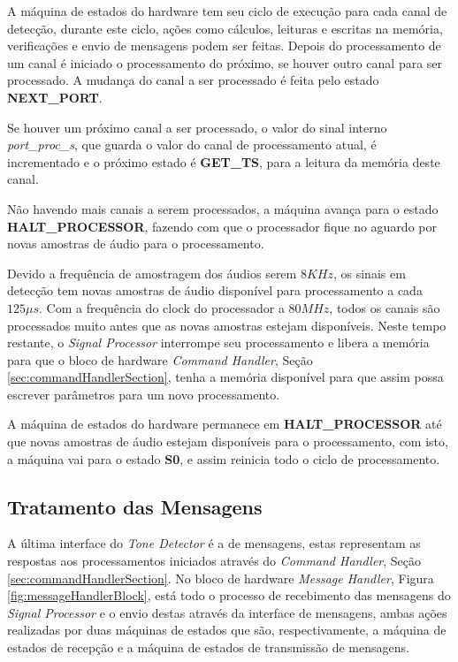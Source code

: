 \documentclass[monografia]{subfiles}
\begin{document}
			\label{sec:hardwareStateNEXTPORT}
				A máquina de estados do hardware tem seu ciclo de execução para cada canal de detecção, durante este ciclo, ações como cálculos, leituras e
				escritas na memória, verificações e envio de mensagens podem ser feitas. Depois do processamento de um canal é iniciado o processamento do 
				próximo, se houver outro canal para ser processado. A mudança do canal a ser processado é feita pelo estado \textbf{NEXT\_PORT}.

				Se houver um próximo canal a ser processado, o valor do sinal interno \textit{port\_proc\_s}, que guarda o valor do canal de processamento atual,
				é incrementado e o próximo estado é \textbf{GET\_TS}, para a leitura da memória deste canal.

				Não havendo mais canais a serem processados, a máquina avança para o estado \textbf{HALT\_PROCESSOR}, fazendo com que o processador fique no aguardo
				por novas amostras de áudio para o processamento.

				\newpage

			\label{sec:hardwareStateHALTPROCESSOR}
				Devido a frequência de amostragem dos áudios serem $8 KHz$, os sinais em detecção tem novas amostras de áudio disponível para processamento
				a cada $125 \mu s$. Com a frequência do clock do processador a $80 MHz$, todos os canais são processados muito antes que as novas amostras 
				estejam disponíveis. Neste tempo restante, o \textit{Signal Processor} interrompe seu processamento e libera a memória para que o bloco de
				hardware \textit{Command Handler}, Seção \ref{sec:commandHandlerSection}, tenha a memória disponível para que assim possa escrever parâmetros
				para um novo processamento.

				A máquina de estados do hardware permanece em \textbf{HALT\_PROCESSOR} até que novas amostras de áudio estejam disponíveis para o processamento,
				com isto, a máquina vai para o estado \textbf{S0}, e assim reinicia todo o ciclo de processamento.


	\subsection{Tratamento das Mensagens}
	\label{sec:messageHandlerBlock}
		A última interface do \textit{Tone Detector} é a de mensagens, estas representam as respostas aos processamentos iniciados através
		do \textit{Command Handler}, Seção \ref{sec:commandHandlerSection}. No bloco de hardware \textit{Message Handler}, Figura \ref{fig:messageHandlerBlock},
		está todo o processo de recebimento das mensagens do \textit{Signal Processor} e o envio destas através da interface de mensagens, ambas ações
		realizadas por duas máquinas de estados que são, respectivamente, a máquina de estados de recepção e a máquina de estados de transmissão de mensagens.
\end{document}
